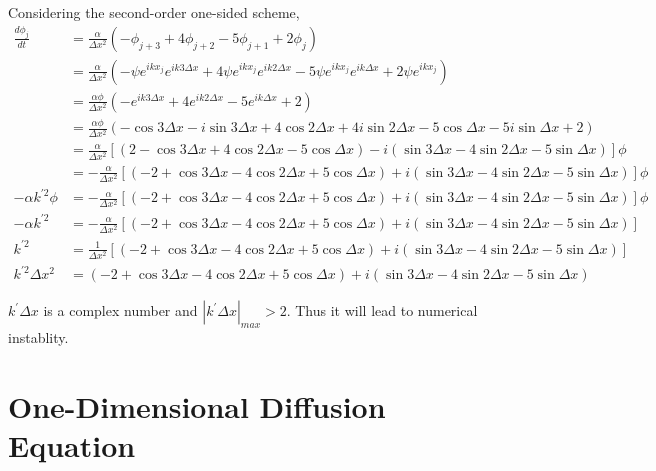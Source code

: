 \documentclass[letterpaper,10pt]{article}
\begin{document}
Considering the second-order one-sided scheme, 
\begin{align*}
  \frac{d\phi_j}{dt}&=\frac{\alpha}{\Delta x^2}\left(-\phi_{j+3}+4\phi_{j+2}-5\phi_{j+1}+2\phi_j\right)\\
  &=\frac{\alpha}{\Delta x^2}\left(-\psi e^{ikx_j}e^{ik3\Delta x}+4\psi e^{ikx_j}e^{ik2\Delta x}-5\psi e^{ikx_j}e^{ik\Delta x}+2\psi e^{ikx_j}\right)\\
  &=\frac{\alpha \phi}{\Delta x^2}\left(-e^{ik3\Delta x}+4e^{ik2\Delta x}-5e^{ik\Delta x}+2\right)\\
  &=\frac{\alpha \phi}{\Delta x^2}\left(-\cos 3\Delta x-i\sin 3\Delta x+4\cos 2\Delta x +4i\sin 2\Delta x - 5\cos \Delta x -5i\sin \Delta x +2\right)\\
  &=\frac{\alpha}{\Delta x^2}\left[\left(2-\cos3\Delta x+4\cos 2\Delta x-5\cos \Delta x\right)-i\left(\sin 3\Delta x -4\sin 2\Delta x - 5\sin \Delta x\right)\right]\phi\\
  &=-\frac{\alpha}{\Delta x^2}\left[\left(-2+\cos3\Delta x-4\cos 2\Delta x+5\cos \Delta x\right)+i\left(\sin 3\Delta x -4\sin 2\Delta x - 5\sin \Delta x\right)\right]\phi\\
  -\alpha k^{'2} \phi &=-\frac{\alpha}{\Delta x^2}\left[\left(-2+\cos3\Delta x-4\cos 2\Delta x+5\cos \Delta x\right)+i\left(\sin 3\Delta x -4\sin 2\Delta x - 5\sin \Delta x\right)\right]\phi\\
  -\alpha k^{'2} &=-\frac{\alpha}{\Delta x^2}\left[\left(-2+\cos3\Delta x-4\cos 2\Delta x+5\cos \Delta x\right)+i\left(\sin 3\Delta x -4\sin 2\Delta x - 5\sin \Delta x\right)\right]\\
  k^{'2}&=\frac{1}{\Delta x^2}\left[\left(-2+\cos3\Delta x-4\cos 2\Delta x+5\cos \Delta x\right)+i\left(\sin 3\Delta x -4\sin 2\Delta x - 5\sin \Delta x\right)\right]\\
  k^{'2}\Delta x^2 &=\left(-2+\cos3\Delta x-4\cos 2\Delta x+5\cos \Delta x\right)+i\left(\sin 3\Delta x -4\sin 2\Delta x - 5\sin \Delta x\right)
\end{align*}

$k^{'}\Delta x$ is a complex number and $|k^{'}\Delta x|_{max}>2$. Thus it will lead to numerical instablity. 
\section{One-Dimensional Diffusion Equation}

\end{document}

